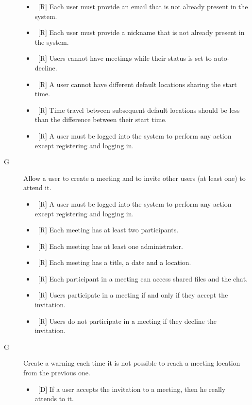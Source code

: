 \begin{description}
\begin{itemize}
\item~[R] Each user must provide an email that is not already present in the system.
\item~[R] Each user must provide a nickname that is not already present in the system.
\item~[R] Users cannot have meetings while their status is set to auto-decline.
\item~[R] A user cannot have different default locations sharing the start time.
\item~[R] Time travel between subsequent default locations should be less than the difference between their start time.
\item~[R] A user must be logged into the system to perform any action except registering and logging in.
\end{itemize}

\item[G\thecountReq] Allow a user to create a meeting and to invite other users (at least one) to attend it.

\begin{itemize}
\item~[R] A user must be logged into the system to perform any action except registering and logging in.
\item~[R] Each meeting has at least two participants.
\item~[R] Each meeting has at least one administrator.
\item~[R] Each meeting has a title, a date and a location.
\item~[R] Each participant in a meeting can access shared files and the chat.
\item~[R] Users participate in a meeting if and only if they accept the invitation.
\item~[R] Users do not participate in a meeting if they decline the invitation.
\end{itemize}

\item[G\thecountReq] Create a warning each time it is not possible to reach a meeting location from the previous one.


\begin{itemize}
\item~[D] If a user accepts the invitation to a meeting, then he really attends to it.
\end{itemize}


\end{description}
